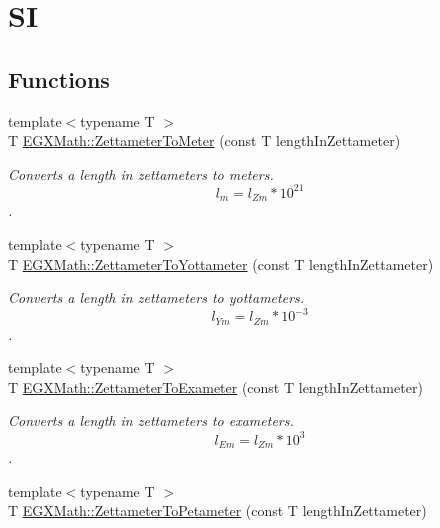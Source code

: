 \hypertarget{group___e_g_x_math-_conversions-_length_conversions-_s_i-_zettameter-_s_i}{}\section{SI}
\label{group___e_g_x_math-_conversions-_length_conversions-_s_i-_zettameter-_s_i}
\subsection*{Functions}
\begin{DoxyCompactItemize}
\item 
{\footnotesize template$<$typename T $>$ }\\T \mbox{\hyperlink{group___e_g_x_math-_conversions-_length_conversions-_s_i-_zettameter-_s_i_ga4965fffbfd10b795231942d8de4e1f2d}{E\+G\+X\+Math\+::\+Zettameter\+To\+Meter}} (const T length\+In\+Zettameter)
\begin{DoxyCompactList}\small\item\em Converts a length in zettameters to meters. \[ l_{m}=l_{Zm} * 10^{21} \]. \end{DoxyCompactList}\item 
{\footnotesize template$<$typename T $>$ }\\T \mbox{\hyperlink{group___e_g_x_math-_conversions-_length_conversions-_s_i-_zettameter-_s_i_ga50b4ccf902ce36f4519ce580bf2234d4}{E\+G\+X\+Math\+::\+Zettameter\+To\+Yottameter}} (const T length\+In\+Zettameter)
\begin{DoxyCompactList}\small\item\em Converts a length in zettameters to yottameters. \[ l_{Ym}=l_{Zm} * 10^{-3} \]. \end{DoxyCompactList}\item 
{\footnotesize template$<$typename T $>$ }\\T \mbox{\hyperlink{group___e_g_x_math-_conversions-_length_conversions-_s_i-_zettameter-_s_i_ga7d9638e3c012b4ff3ad3dc0e0f0393b2}{E\+G\+X\+Math\+::\+Zettameter\+To\+Exameter}} (const T length\+In\+Zettameter)
\begin{DoxyCompactList}\small\item\em Converts a length in zettameters to exameters. \[ l_{Em}=l_{Zm} * 10^{3} \]. \end{DoxyCompactList}\item 
{\footnotesize template$<$typename T $>$ }\\T \mbox{\hyperlink{group___e_g_x_math-_conversions-_length_conversions-_s_i-_zettameter-_s_i_ga85af5c37065cd355ac23b12a4f7b16f5}{E\+G\+X\+Math\+::\+Zettameter\+To\+Petameter}} (const T length\+In\+Zettameter)

\end{DoxyCompactItemize}
